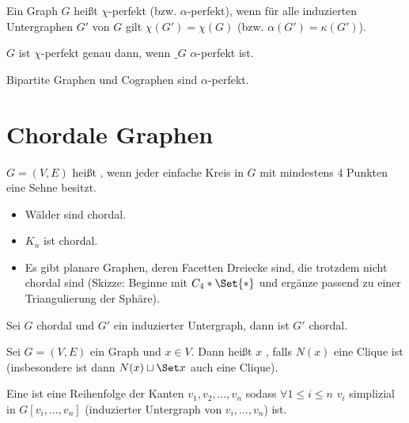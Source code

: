 \begin{df}
    Ein Graph $G$ heißt $\chi$-perfekt (bzw. $\alpha$-perfekt), wenn für alle induzierten Untergraphen $G'$ von $G$ gilt $\chi(G') = \chi(G)$ (bzw. $\alpha(G') = \kappa(G')$).
\end{df}

\begin{st}
    $G$ ist $\chi$-perfekt genau dann, wenn $\_G$ $\alpha$-perfekt ist.
\end{st}

\begin{st}
    Bipartite Graphen und Cographen sind $\alpha$-perfekt.
\end{st}


\section{Chordale Graphen}

\begin{df}
    $G = (V, E)$ heißt , wenn jeder einfache Kreis in $G$ mit mindestens $4$ Punkten eine Sehne besitzt.
\end{df}

\begin{ex}
    \begin{itemize}
        \item
            Wälder sind chordal.
        \item
            $K_n$ ist chordal.
        \item
            Es gibt planare Graphen, deren Facetten Dreiecke sind, die trotzdem nicht chordal sind (Skizze: Beginne mit $C_4 \ast \Set{*}$ und ergänze passend zu einer Triangulierung der Sphäre).
    \end{itemize}
\end{ex}

\begin{lem}
    Sei $G$ chordal und $G'$ ein induzierter Untergraph, dann ist $G'$ chordal.
\end{lem}

\begin{df}
    Sei $G = (V, E)$ ein Graph und $x \in V$.
    Dann heißt $x$ , falls $N(x)$ eine Clique ist
    (insbesondere ist dann $N(x) \sqcup \Set x$ auch eine Clique).

    Eine  ist eine Reihenfolge der Kanten $v_1, v_2, \dotsc, v_n$ sodass
    $\forall 1 \le i \le n$ $v_i$ simplizial in $G[v_i, \dotsc, v_n]$ (induzierter Untergraph von $v_i, \dotsc, v_n$) ist.
\end{df}


